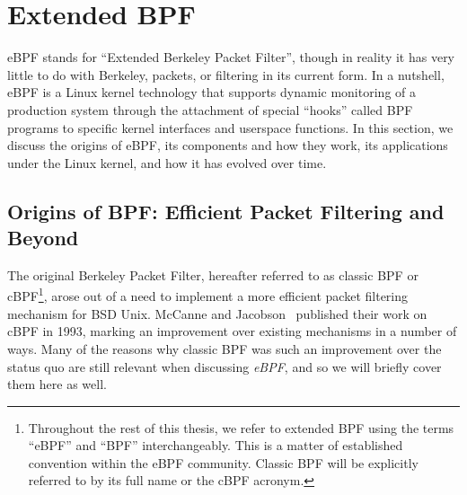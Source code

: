 



\section{Extended BPF}%
\label{s:ebpf-bg}

eBPF stands for \enquote{Extended Berkeley Packet Filter}, though in reality it has very
little to do with Berkeley, packets, or filtering in its current form.  In a nutshell,
eBPF is a Linux kernel technology that supports dynamic monitoring of a production system
through the attachment of special \enquote{hooks} called BPF programs to specific kernel
interfaces and userspace functions. In this section, we discuss the origins of eBPF, its
components and how they work, its applications under the Linux kernel, and how it has
evolved over time.


\subsection{Origins of BPF\@: Efficient Packet Filtering and Beyond}%
\label{ss:origins-of-bpf-bg}

The original Berkeley Packet Filter, hereafter referred to as classic BPF or
cBPF\footnote{Throughout the rest of this thesis, we refer to extended BPF using the terms
\enquote{eBPF} and \enquote{BPF} interchangeably. This is a matter of established
convention within the eBPF community. Classic BPF will be explicitly referred to by its
full name or the cBPF acronym.}, arose out of a need to implement a more efficient packet
filtering mechanism for BSD Unix.  McCanne and Jacobson~\cite{mccanne1993_bpf} published
their work on cBPF in 1993, marking an improvement over existing mechanisms in a number of
ways. Many of the reasons why classic BPF was such an improvement over the status quo are
still relevant when discussing \textit{eBPF}, and so we will briefly cover them here as
well.

